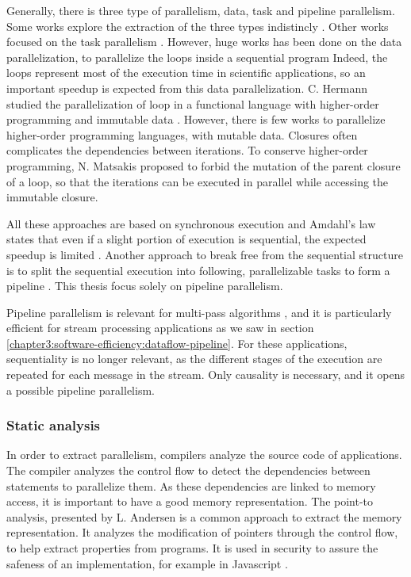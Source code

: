 Generally, there is three type of parallelism, data, task and pipeline parallelism.
Some works explore the extraction of the three types indistincly \cite{Li2012}.
Other works focused on the task parallelism \cite{Rinard1996}.
However, huge works has been done on the data parallelization, to parallelize the loops inside a sequential program \cite{Mauras1989,Amarasinghe1995,Yuki2013,Banerjee2013,Radoi2014}
Indeed, the loops represent most of the execution time in scientific applications, so an important speedup is expected from this data parallelization.
C. Hermann studied the parallelization of loop in a functional language with higher-order programming and immutable data \cite{Herrmann2000}.
However, there is few works to parallelize higher-order programming languages, with mutable data.
Closures often complicates the dependencies between iterations.
To conserve higher-order programming, N. Matsakis proposed to forbid the mutation of the parent closure of a loop, so that the iterations can be executed in parallel while accessing the immutable closure\cite{Matsakis2012a}.

All these approaches are based on synchronous execution and Amdahl's law states that even if a slight portion of execution is sequential, the expected speedup is limited \cite{Amdahl1967,Clements2013a}.
Another approach to break free from the sequential structure is to split the sequential execution into following, parallelizable tasks to form a pipeline \cite{Kamruzzaman2013,Fernandez2014a}.
This thesis focus solely on pipeline parallelism.

Pipeline parallelism is relevant for multi-pass algorithms \cite{Conway1963}, and it is particularly efficient for stream processing applications as we saw in section \ref{chapter3:software-efficiency:dataflow-pipeline}.
For these applications, sequentiality is no longer relevant, as the different stages of the execution are repeated for each message in the stream.
Only causality is necessary, and it opens a possible pipeline parallelism.


\subsubsection{Static analysis}

In order to extract parallelism, compilers analyze the source code of applications.
The compiler analyzes the control flow to detect the dependencies between statements to parallelize them.
As these dependencies are linked to memory access, it is important to have a good memory representation.
The point-to analysis, presented by L. Andersen \cite{Andersen1994} is a common approach to extract the memory representation.
It analyzes the modification of pointers through the control flow, to help extract properties from programs.
It is used in security to assure the safeness of an implementation, for example in Javascript \cite{Chudnov2015}.

